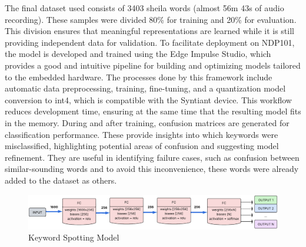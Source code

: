 The final dataset used consists of 3403 sheila words (almost 56m 43s of audio recording). These samples were divided 80\% for training and 20\% for evaluation. This division ensures that meaningful representations are learned while it is still providing independent data for validation.
To facilitate deployment on NDP101, the model is developed and trained using the Edge Impulse Studio\cite{edgeimpulse_kws_example}, which provides a good and intuitive pipeline for building and optimizing models tailored to the embedded hardware. The processes done by this framework include automatic data preprocessing, training, fine-tuning, and a quantization model conversion to int4, which is compatible with the Syntiant device. This workflow reduces development time, ensuring at the same time that the resulting model fits in the memory.
During and after training, confusion matrices are generated for classification performance. These provide insights into which keywords were misclassified, highlighting potential areas of confusion and suggesting model refinement. They are useful in identifying failure cases, such as confusion between similar-sounding words and to avoid this inconvenience, these words were already added to the dataset as others.
\begin{center}
  \begin{figure}[!h]
  \centering
  \includegraphics[width=1.0\textwidth]{images/3.01 KWS Model.png}
  \caption{Keyword Spotting Model}
\end{figure}
\end{center}
